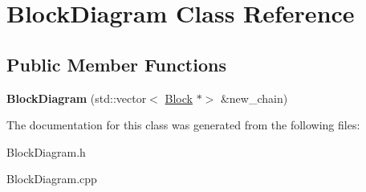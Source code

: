 \hypertarget{classBlockDiagram}{}\section{Block\+Diagram Class Reference}
\label{classBlockDiagram}
\subsection*{Public Member Functions}
\begin{DoxyCompactItemize}
\item 
\mbox{\label{classBlockDiagram_a5cde235c648f21e5b3fb89ef5db98c49}} 
{\bfseries Block\+Diagram} (std\+::vector$<$ \hyperlink{classBlock}{Block} $\ast$$>$ \&new\+\_\+chain)
\end{DoxyCompactItemize}


The documentation for this class was generated from the following files\+:\begin{DoxyCompactItemize}
\item 
Block\+Diagram.\+h\item 
Block\+Diagram.\+cpp\end{DoxyCompactItemize}
